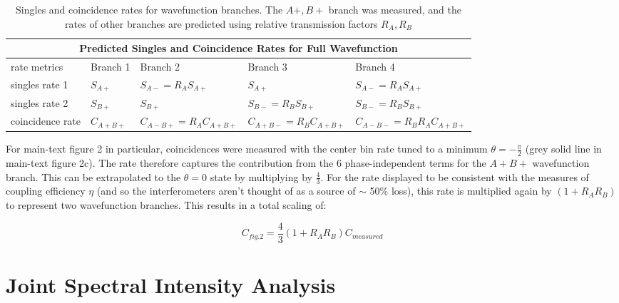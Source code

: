\documentclass[11pt]{caltech_thesis} %
\begin{document}
\begin{table}
\label{table:branches}
\begin{tabular}{ |p{2.5cm}||p{1.3cm}|p{2.9cm}|p{2.9cm}|p{3.4cm}|  }
\hline
\multicolumn{5}{|c|}{Predicted Singles and Coincidence Rates for Full Wavefunction} \\
\hline
rate metrics     &  Branch 1 & Branch 2 & Branch 3 & Branch 4 \label{table:rates}\\
\hline
singles rate 1  & $S_{A+}$ &$S_{A-}=R_A S_{A+}$    &$S_{A+}$               &$S_{A-}=R_A S_{A+}$        \\
singles rate 2  & $S_{B+}$ &$S_{B+}$               &$S_{B-} = R_B S_{B+}$  &$S_{B-} = R_B S_{B+}$      \\
coincidence rate&\textcolor{color1}{$C_{A+B+}$}&\textcolor{color3}{$C_{A-B+}=R_A C_{A+B+}$}&\textcolor{color2}{$C_{A+B-}=R_B C_{A+B+}$}&\textcolor{color4}{$C_{A-B-}=R_B R_A C_{A+B+}$}\\
\hline
\end{tabular}
\caption[{Rates for wavefunction branches}]{Singles and coincidence rates for wavefunction branches. The $A+, B+$ branch was measured, and the rates of other branches are predicted using relative transmission factors $R_A, R_B$}
\end{table}

For main-text figure 2 in particular, coincidences were measured with the center bin rate tuned to a minimum $\theta=-\frac{\pi}{2}$ (grey solid line in main-text figure 2c). The rate therefore captures the contribution from the 6 phase-independent terms for the $A\!\!+\!\!B\!+\!$ wavefunction branch. This can be extrapolated to the $\theta=0$ state by multiplying by $\frac{4}{3}$. For the rate displayed to be consistent with the measures of coupling efficiency $\eta$ (and so the interferometers aren't thought of as a source of $\sim$ 50\% loss), this rate is multiplied again by $(1 + R_AR_B)$ to represent two wavefunction branches. This results in a total scaling of:

$$C_{fig. 2} = \frac{4}{3}(1 + R_AR_B)C_{measured}$$

\hypertarget{joint-spectral-intensity-analysis}{%
\section{Joint Spectral Intensity Analysis}\label{joint-spectral-intensity-analysis}}
\end{document}
